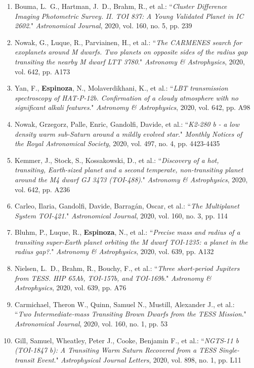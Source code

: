 \documentclass[12pt, a4paper]{article} %
\begin{document}
\begin{flushleft}
\begin{enumerate}
\item Bouma, L.~G., Hartman, J.~D., Brahm, R., et al.: ``\textit{Cluster Difference Imaging Photometric Survey. II. TOI 837: A Young Validated Planet in IC 2602}." \textit{Astronomical Journal}, 2020, vol. 160, no. 5, pp. 239
\item Nowak, G., Luque, R., Parviainen, H., et al.: ``\textit{The CARMENES search for exoplanets around M dwarfs. Two planets on opposite sides of the radius gap transiting the nearby M dwarf LTT 3780}." \textit{Astronomy \& Astrophysics}, 2020, vol. 642, pp. A173
\item Yan, F., \textbf{Espinoza}, N., Molaverdikhani, K., et al.: ``\textit{LBT transmission spectroscopy of HAT-P-12b. Confirmation of a cloudy atmosphere with no significant alkali features}." \textit{Astronomy \& Astrophysics}, 2020, vol. 642, pp. A98
\item Nowak, Grzegorz, Palle, Enric, Gandolfi, Davide, et al.: ``\textit{K2-280 b - a low density warm sub-Saturn around a mildly evolved star}." \textit{Monthly Notices of the Royal Astronomical Society}, 2020, vol. 497, no. 4, pp. 4423-4435
\item Kemmer, J., Stock, S., Kossakowski, D., et al.: ``\textit{Discovery of a hot, transiting, Earth-sized planet and a second temperate, non-transiting planet around the M4 dwarf GJ 3473 (TOI-488)}." \textit{Astronomy \& Astrophysics}, 2020, vol. 642, pp. A236
\item Carleo, Ilaria, Gandolfi, Davide, Barragán, Oscar, et al.: ``\textit{The Multiplanet System TOI-421}." \textit{Astronomical Journal}, 2020, vol. 160, no. 3, pp. 114
\item Bluhm, P., Luque, R., \textbf{Espinoza}, N., et al.: ``\textit{Precise mass and radius of a transiting super-Earth planet orbiting the M dwarf TOI-1235: a planet in the radius gap?}." \textit{Astronomy \& Astrophysics}, 2020, vol. 639, pp. A132
\item Nielsen, L.~D., Brahm, R., Bouchy, F., et al.: ``\textit{Three short-period Jupiters from TESS. HIP 65Ab, TOI-157b, and TOI-169b}." \textit{Astronomy \& Astrophysics}, 2020, vol. 639, pp. A76
\item Carmichael, Theron W., Quinn, Samuel N., Mustill, Alexander J., et al.: ``\textit{Two Intermediate-mass Transiting Brown Dwarfs from the TESS Mission}." \textit{Astronomical Journal}, 2020, vol. 160, no. 1, pp. 53
\item Gill, Samuel, Wheatley, Peter J., Cooke, Benjamin F., et al.: ``\textit{NGTS-11 b (TOI-1847 b): A Transiting Warm Saturn Recovered from a TESS Single-transit Event}." \textit{Astrophysical Journal Letters}, 2020, vol. 898, no. 1, pp. L11

\end{enumerate}
\end{flushleft}
\end{document}
